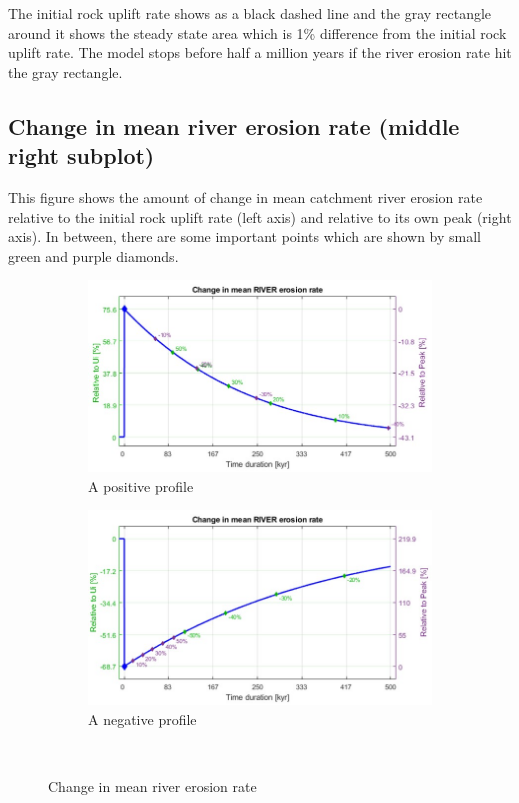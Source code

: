 \documentclass[11pt,a4paper,titlepage]{report}
\begin{document}
The initial rock uplift rate shows as a black dashed line and the gray rectangle around it shows the steady state area which is 1\% difference from the initial rock uplift rate. The model stops before half a million years if the river erosion rate hit the gray rectangle.

\subsection{Change in mean river erosion rate (middle right subplot)}
This figure shows the amount of change in mean catchment river erosion rate relative to the initial rock uplift rate (left axis) and relative to its own peak (right axis). In between, there are some important points which are shown by small green and purple diamonds.

\begin{figure}[H]
    \centering
    \begin{subfigure}[H]{0.45\textwidth}
        \includegraphics[width=\textwidth]{RE_p.jpg}
        \caption{A positive profile}
    \end{subfigure}
    \quad
    \begin{subfigure}[H]{0.45\textwidth}
        \includegraphics[width=\textwidth]{RE_n.jpg}
        \caption{A negative profile}
    \end{subfigure}\\
    \caption[Change in mean river erosion rate]{Change in mean river erosion rate}
    \label{fig:erosionrate}    
\end{figure}
\end{document}
